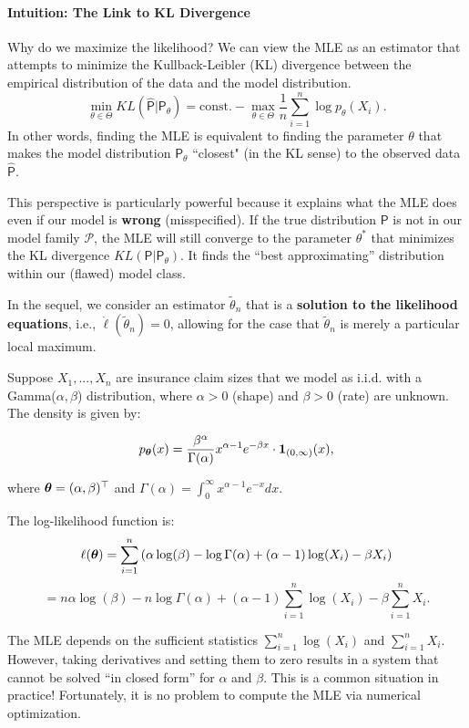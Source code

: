 \paragraph{Intuition: The Link to KL Divergence}
Why do we maximize the likelihood? We can view the MLE as an estimator that attempts to minimize the Kullback-Leibler (KL) divergence between the empirical distribution of the data and the model distribution.
\[
\min_{\theta \in \Theta} KL(\widehat{\mathsf{P}}|\mathsf{P}_{\theta}) = \text{const.} - \max_{\theta \in \Theta} \frac{1}{n} \sum\limits_{i=1}^{n} \log p_{\theta}(X_i).
\]
In other words, finding the MLE is equivalent to finding the parameter \(\theta\) that makes the model distribution \(\mathsf{P}_\theta\) ``closest" (in the KL sense) to the observed data \(\widehat{\mathsf{P}}\).

\begin{note}
This perspective is particularly powerful because it explains what the MLE does even if our model is \textbf{wrong} (misspecified). If the true distribution \(\mathsf{P}\) is not in our model family \(\mathcal{P}\), the MLE will still converge to the parameter \(\theta^*\) that minimizes the KL divergence \(KL(\mathsf{P}|\mathsf{P}_{\theta})\). It finds the ``best approximating'' distribution within our (flawed) model class.
\end{note}

In the sequel, we consider an estimator \(\tilde{\theta}_n\) that is a \textbf{solution to the likelihood equations}, i.e., \(\dot{\ell}(\tilde{\theta}_n) = 0\), allowing for the case that \(\tilde{\theta}_n\) is merely a particular local maximum.

\begin{ex}
    
\label{example-13.1.-gamma-distribution-model}

Suppose \(X_1, ..., X_n\) are insurance claim sizes that we model as i.i.d. with a Gamma(\(\alpha, \beta\)) distribution, where \(\alpha > 0\) (shape) and \(\beta > 0\) (rate) are unknown. The density is given by:

\[ p_{\boldsymbol{\theta}}(x) = \frac{\beta^{\alpha}}{\Gamma(\alpha)} x^{\alpha - 1} e^{-\beta x} \cdot \mathbf{1}_{(0,\infty)}(x), \]

where \(\boldsymbol{\theta} = (\alpha, \beta)^{\top}\) and \(\Gamma(\alpha) = \int_0^{\infty} x^{\alpha - 1} e^{-x} dx\).

The log-likelihood function is:
\[ \ell(\boldsymbol{\theta}) = \sum\limits_{i=1}^{n} \left( \alpha \log(\beta) - \log \Gamma(\alpha) + (\alpha - 1) \log(X_i) - \beta X_i \right) \]
\[ = n\alpha \log(\beta) - n \log \Gamma(\alpha) + (\alpha - 1) \sum\limits_{i=1}^{n} \log(X_i) - \beta \sum\limits_{i=1}^{n} X_i. \]

The MLE depends on the sufficient statistics \(\sum\limits_{i=1}^{n} \log(X_i)\) and \(\sum\limits_{i=1}^{n} X_i\). However, taking derivatives and setting them to zero results in a system that cannot be solved ``in closed form'' for \(\alpha\) and \(\beta\).
This is a common situation in practice! Fortunately, it is no problem to compute the MLE via numerical optimization.
\end{ex}


